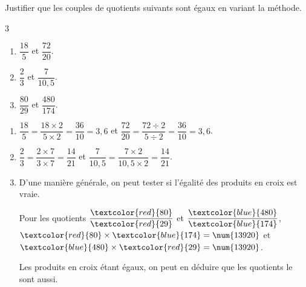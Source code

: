 \begin{exercice*}
    Justifier que les couples de quotients suivants sont égaux en variant la méthode.
    \begin{multicols}3
        \begin{enumerate}
            \item $\dfrac{18}{5}$ et $\dfrac{72}{20}$.
            \item $\dfrac{2}{3}$ et $\dfrac{7}{10,5}$.
            \item $\dfrac{80}{29}$ et $\dfrac{480}{174}$.
        \end{enumerate}
    \end{multicols}
\end{exercice*}
\begin{corrige}
    \begin{spacing}{2}
    \begin{enumerate}        
        \item $\dfrac{18}{5} = \dfrac{18\times 2}{5\times 2} = \dfrac{36}{10} = 3,6$ et $\dfrac{72}{20} = \dfrac{72\div 2}{5\div 2} = \dfrac{36}{10} = 3,6$.
        \item $\dfrac{2}{3} = \dfrac{2\times 7}{3\times 7} = \dfrac{14}{21}$ et $\dfrac{7}{10,5}= \dfrac{7\times 2}{10,5\times 2} = \dfrac{14}{21}$.
        \item D'une manière générale, on peut tester si l'égalité des produits en croix est vraie.        
        
        Pour les quotients $\dfrac{\textcolor{red}{80}}{\textcolor{red}{29}}$ et $\dfrac{\textcolor{blue}{480}}{\textcolor{blue}{174}}$, 
        $\textcolor{red}{80}\times \textcolor{blue}{174} = \num{13920}$ et $\textcolor{blue}{480}\times \textcolor{red}{29} = \num{13920}$.

        Les produits en croix étant égaux, on peut en déduire que les quotients le sont aussi.        
    \end{enumerate}
    \end{spacing}
\end{corrige}

